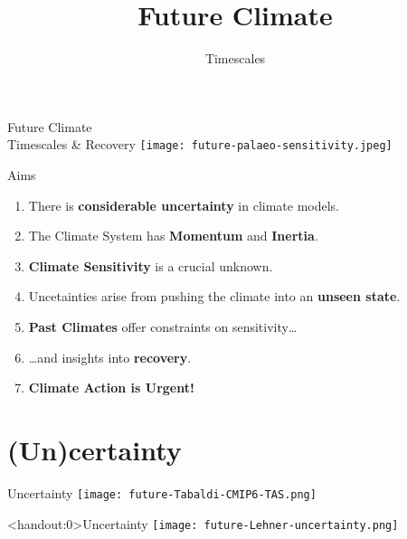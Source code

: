\documentclass[aspectratio=169]{beamer}
\title{Future Climate}
\author{Timescales}
\begin{document}

\begin{frame}{Future Climate\\Timescales \& Recovery}
    \texttt{[image: future-palaeo-sensitivity.jpeg]}
\end{frame}

\begin{frame}{Aims}

    \begin{enumerate}
        \item There is \textbf{considerable uncertainty} in climate models.
        \item The Climate System has \textbf{Momentum} and \textbf{Inertia}.
        \item \textbf{Climate Sensitivity} is a crucial unknown.
        \item Uncetainties arise from pushing the climate into an \textbf{unseen state}.
        \item \textbf{Past Climates} offer constraints on sensitivity\dots
        \item \dots and insights into \textbf{recovery}.
        \item \textbf{Climate Action is Urgent!}
    \end{enumerate}

\end{frame}

\section{(Un)certainty}

\begin{frame}{Uncertainty}
    \centering
    \texttt{[image: future-Tabaldi-CMIP6-TAS.png]}
\end{frame}

\begin{frame}<handout:0>{Uncertainty}
    \centering
    \texttt{[image: future-Lehner-uncertainty.png]}
\end{frame}
\end{document}
